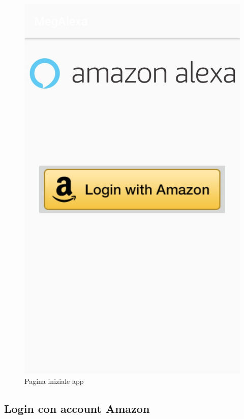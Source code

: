 \begin{figure}[!ht]
	\centering
	\includegraphics[scale=0.2]{images/Login.jpg}
	\caption{Pagina iniziale app}
\end{figure}
\newpage
\subsection{Login con account Amazon}

